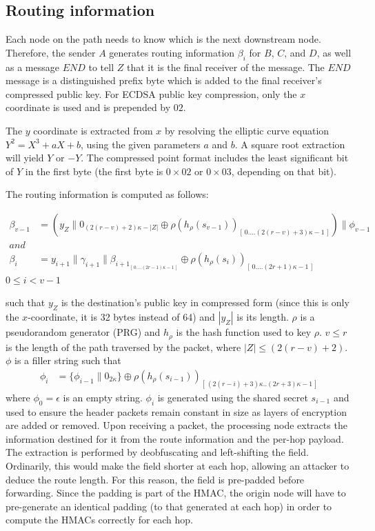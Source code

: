 \subsection{Routing information}
Each node on the path needs to know which is the next downstream node. Therefore, the sender $A$ generates routing information $\beta_i$ for $B$, $C$, and $D$, as well as a message $END$ to tell $Z$ that it is the final receiver of the message. 
The $END$ message is a distinguished prefix byte which is added to the final receiver's compressed public key.
For ECDSA public key compression, only the $x$ coordinate is used and is prepended by $02$. 

The $y$ coordinate is extracted from $x$ by resolving the elliptic curve equation $Y^2=X^3+aX+b$, using the given parameters $a$ and $b$. A square root extraction will yield $Y$ or $-Y$. The compressed point format includes the least significant bit of $Y$ in the first byte (the first byte is $0\times02$ or $0\times03$, depending on that bit).

The routing information is computed as follows:

\begin{align}  
    \beta_{v-1} &=(y_Z\|0_{(2(r-v)+2)\kappa-|Z|}\oplus \rho(h_{\rho}(s_{v-1}))_{[ \,0....(2(r-v)+3)\kappa-1\,]})\|\phi_{v-1}\\
    and &\nonumber \\
    \beta_i &=y_{i+1}\|\gamma_{i+1}\|\beta_{{i+1}_{[ \,0....(2r-1)\kappa-1\,] }}\oplus \rho(h_{\rho}(s_{i}))_{[ \,0....(2r+1)\kappa-1\,]} 
    \label{eq:2}
\end{align}
$0\le i < v-1$

such that $y_Z$ is the destination's public key in compressed form (since this is only the $x$-coordinate, it is 32 bytes instead of 64) and $|y_Z|$ is its length. $\rho$ is a pseudorandom generator (PRG) and $h_{\rho}$ is the hash function used to key $\rho$.
$v\leq r$ is the length of the path traversed by the packet, where $|Z| \leq (2(r - v) + 2)$. $\phi$ is a filler string such that
\begin{align}  
    \phi_i&=\{ \phi_{i-1}\|0_{2\kappa}\}\oplus \rho(h_{\rho}(s_{i-1}))_{[ \,(2(r-i)+3)\kappa..(2r+3)\kappa-1\,]}
\end{align}
where $\phi_0=\epsilon$ is an empty string. $\phi_i$ is generated using the shared secret $s_{i-1}$ and used to ensure the header packets remain constant in size as layers of encryption are added or removed. Upon receiving a packet, the processing node extracts the information destined for it from the route information and the per-hop payload. The extraction is performed by deobfuscating and left-shifting the field. Ordinarily, this would make the field shorter at each hop, allowing an attacker to deduce the route length. For this reason, the field is pre-padded before forwarding. Since the padding is part of the HMAC, the origin node will have to pre-generate an identical padding (to that generated at each hop) in order to compute the HMACs correctly for each hop.
    
